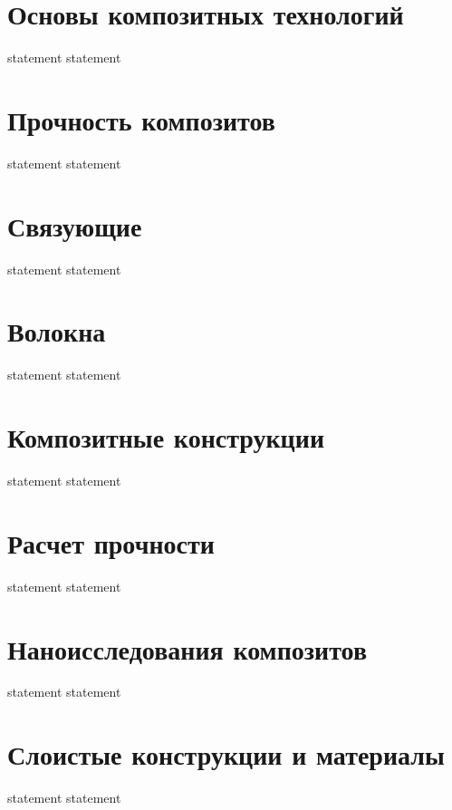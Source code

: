 \section{Основы композитных технологий}

{statement}
{statement}

\section{Прочность композитов}

{statement}
{statement}

\section{Связующие}

{statement}
{statement}

\section{Волокна}

{statement}
{statement}

\section{Композитные конструкции}

{statement}
{statement}

\section{Расчет прочности}

{statement}
{statement}

\section{Наноисследования композитов}

{statement}
{statement}

\section{Слоистые конструкции и материалы}

{statement}
{statement}